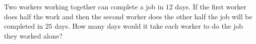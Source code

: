 
%
%
%
%
% 
% 

\question[4] Two workers working together can complete a job in $12$ days. If the first worker does half the work and then the second worker does the other half the job will be completed in $25$ days. How many days would it take each worker to do the job they worked alone?


\ifprintanswers
\fi 


